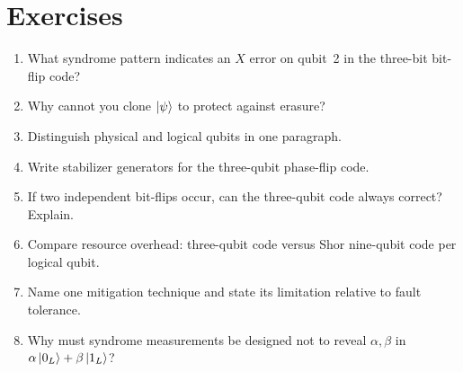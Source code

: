 \section*{Exercises}
\begin{enumerate}[label=\arabic*.]
\item What syndrome pattern indicates an $X$ error on qubit~2 in the three-bit bit-flip code?
\item Why cannot you clone $\ket{\psi}$ to protect against erasure?
\item Distinguish physical and logical qubits in one paragraph.
\item Write stabilizer generators for the three-qubit phase-flip code.
\item If two independent bit-flips occur, can the three-qubit code always correct? Explain.
\item Compare resource overhead: three-qubit code versus Shor nine-qubit code per logical qubit.
\item Name one mitigation technique and state its limitation relative to fault tolerance.
\item Why must syndrome measurements be designed not to reveal $\alpha,\beta$ in $\alpha\ket{0_L}+\beta\ket{1_L}$?
\end{enumerate}
